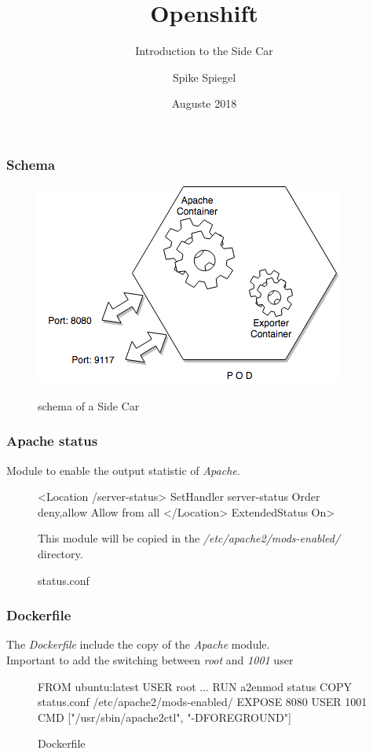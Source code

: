 \documentclass{beamer}
\title{Openshift}
\subtitle{Introduction to the Side Car}
\author{Spike Spiegel}
\institute{Cowboy Bebop}
\date{Auguste 2018}
\begin{document}
\frame{\titlepage}


\begin{frame}[fragile]
  \frametitle{Schema}
\begin{figure}[ht]
  \caption{schema of a Side Car}
  \centering
  \includegraphics[scale=0.6]{SidecarDiagram.png}
  \label{fig:SidecarDiagram}
\end{figure}
\end{frame}

\begin{frame}[fragile]
  \frametitle{Apache status}
  Module to enable the output statistic of \emph{Apache}.
  
  \begin{figure}
    \begin{apachecode}
      <Location /server-status>
      SetHandler server-status
      Order deny,allow
      Allow from all
      </Location> ExtendedStatus On>
    \end{apachecode}
    \caption{status.conf}
    
    This module will be copied in the \emph{/etc/apache2/mods-enabled/} directory.
  \end{figure}
\end{frame}

\begin{frame}[fragile]
  \frametitle{Dockerfile}
  The \emph{Dockerfile} include the copy of the \emph{Apache} module.\\
  Important to add the switching between \textit{root} and \textit{1001} user
  \begin{figure}
    \begin{dockercode}
      FROM ubuntu:latest
      USER root
      ...
      RUN a2enmod status
      COPY status.conf /etc/apache2/mods-enabled/
      EXPOSE 8080
      USER 1001
      CMD ["/usr/sbin/apache2ctl", "-DFOREGROUND"]
    \end{dockercode}
    \caption{Dockerfile}
  \end{figure}
  
\end{frame}
\end{document}
